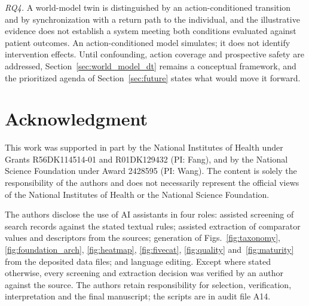 \documentclass[journal]{IEEEtran}
\begin{document}
\emph{RQ4.} A world-model twin is distinguished by an action-conditioned transition and by synchronization with a return path to the individual, and the illustrative evidence does not establish a system meeting both conditions evaluated against patient outcomes. An action-conditioned model simulates; it does not identify intervention effects. Until confounding, action coverage and prospective safety are addressed, Section~\ref{sec:world_model_dt} remains a conceptual framework, and the prioritized agenda of Section~\ref{sec:future} states what would move it forward.

\section*{Acknowledgment}
This work was supported in part by the National Institutes of Health under Grants R56DK114514-01 and R01DK129432 (PI: Fang), and by the National Science Foundation under Award 2428595 (PI: Wang). The content is solely the responsibility of the authors and does not necessarily represent the official views of the National Institutes of Health or the National Science Foundation.

The authors disclose the use of AI assistants in four roles: assisted screening of search records against the stated textual rules; assisted extraction of comparator values and descriptors from the sources; generation of Figs.~\ref{fig:taxonomy}, \ref{fig:foundation_arch}, \ref{fig:heatmap}, \ref{fig:fivecat}, \ref{fig:quality} and~\ref{fig:maturity} from the deposited data files; and language editing. Except where stated otherwise, every screening and extraction decision was verified by an author against the source. The authors retain responsibility for selection, verification, interpretation and the final manuscript; the scripts are in audit file A14.



\end{document}
